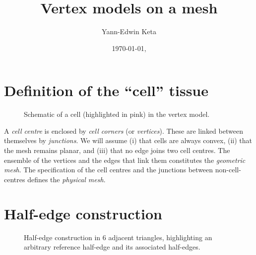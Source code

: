 \documentclass[aps, superscriptaddress, notitlepage]{revtex4-1}
\begin{document}

\title{Vertex models on a mesh}
\author{Yann-Edwin Keta}
\date{\today, \currenttime}
\maketitle


\section{Definition of the ``cell'' tissue}

\begin{figure}[H]
\centering
\begin{tikzpicture}[scale=0.75*\scale]

\end{tikzpicture}
\caption{Schematic of a cell (highlighted in pink) in the vertex model.}
\label{fig:schematic}
\end{figure}

A \textit{cell centre} is enclosed by \textit{cell corners} (or \textit{vertices}). These are linked between themselves by \textit{junctions}. We will assume (i) that cells are always convex, (ii) that the mesh remains planar, and (iii) that no edge joins two cell centres. The ensemble of the vertices and the edges that link them constitutes the \textit{geometric mesh}. The specification of the cell centres and the junctions between non-cell-centres defines the \textit{physical mesh}.

\section{Half-edge construction}

\begin{figure}[!b]
\centering
\begin{tikzpicture}[scale=0.8*\scale]

\end{tikzpicture}
\caption{Half-edge construction in 6 adjacent triangles, highlighting an arbitrary reference half-edge and its associated half-edges.}
\label{fig:he}
\end{figure}
\end{document}
